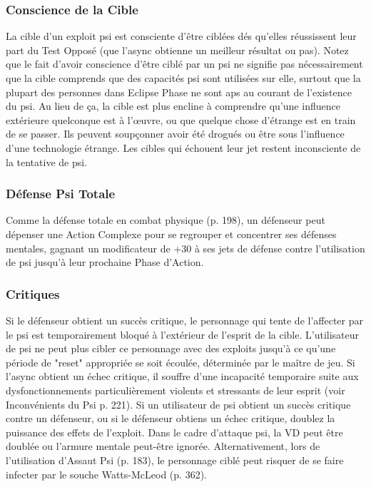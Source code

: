 \subsubsection{Conscience de la Cible} 

La cible d'un exploit psi est consciente d'être ciblées dés qu'elles réussissent leur part du Test Opposé (que l'async obtienne un meilleur résultat ou pas). Notez que le fait d'avoir conscience d'être ciblé par un psi ne signifie pas nécessairement que la cible comprends que des capacités psi sont utilisées sur elle, surtout que la plupart des personnes dans Eclipse Phase ne sont aps au courant de l'existence du psi. Au lieu de ça, la cible est plus encline à comprendre qu'une influence extérieure quelconque est à l'œuvre, ou que quelque chose d'étrange est en train de se passer. Ils peuvent soupçonner avoir été drogués ou être sous l'influence d'une technologie étrange. Les cibles qui échouent leur jet restent inconsciente de la tentative de psi. 

\subsubsection{Défense Psi Totale} 

Comme la défense totale en combat physique (p. 198), un défenseur peut dépenser une Action Complexe pour se regrouper et concentrer ses défenses mentales, gagnant un modificateur de +30 à ses jets de défense contre l'utilisation de psi jusqu'à leur prochaine Phase d'Action. 

\subsubsection{Critiques} 

Si le défenseur obtient un succès critique, le personnage qui tente de l'affecter par le psi est temporairement bloqué à l'extérieur de l'esprit de la cible. L'utilisateur de psi ne peut plus cibler ce personnage avec des exploits jusqu'à ce qu'une période de "reset" appropriée se soit écoulée, déterminée par le maître de jeu. Si l'async obtient un échec critique, il souffre d'une incapacité temporaire suite aux dysfonctionnements particulièrement violents et stressants de leur esprit (voir Inconvénients du Psi p. 221). Si un utilisateur de psi obtient un succès critique contre un défenseur, ou si le défenseur obtiens un échec critique, doublez la puissance des effets de l'exploit. Dans le cadre d'attaque psi, la VD peut être doublée ou l'armure mentale peut-être ignorée. Alternativement, lors de l'utilisation d'Assaut Psi (p. 183), le personnage ciblé peut risquer de se faire infecter par le souche Watts-McLeod (p. 362). 

